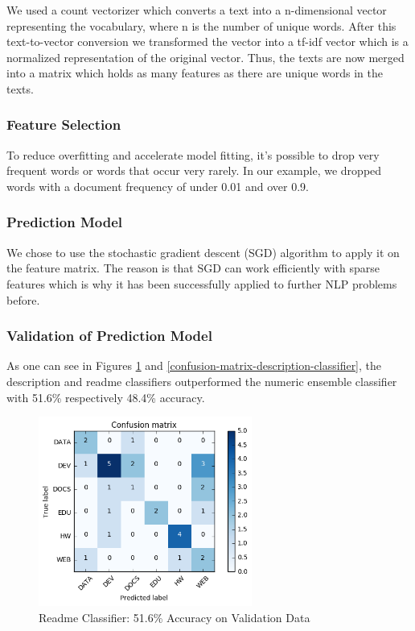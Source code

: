 \documentclass[%
a4paper,
DIV12,
2.5headlines,
bigheadings,
titlepage,
openbib,
]{scrartcl}
\begin{document}
We used a count vectorizer which converts a text into a n-dimensional vector representing the vocabulary, where n is the number of unique words.
After this text-to-vector conversion we transformed the vector into a tf-idf vector which is a normalized representation of the original vector.
Thus, the texts are now merged into a matrix which holds as many features as there are unique words in the texts.

\subsubsection{Feature Selection}\label{feature-selection-1}

To reduce overfitting and accelerate model fitting, it's possible to drop very frequent words or words that occur very rarely.
In our example, we dropped words with a document frequency of under 0.01 and over 0.9.

\subsubsection{Prediction Model}\label{prediction-model-1}

We chose to use the stochastic gradient descent (SGD) algorithm to apply it on the feature matrix.
The reason is that SGD can work efficiently with sparse features which is why it has been successfully applied to further NLP problems before.

\subsubsection{Validation of Prediction Model}\label{validation-of-prediction-model-1}

As one can see in Figures \ref{confusion-matrix-readme-classifier} and \ref{confusion-matrix-description-classifier}, the description and readme classifiers outperformed the numeric ensemble classifier with 51.6\% respectively 48.4\% accuracy.
\begin{figure}[H]
	\centering
		\includegraphics[width=7cm]{graphics/confusion-matrix-readme-classifier.png}
	\caption{Readme Classifier: 51.6\% Accuracy on Validation Data}
	\label{confusion-matrix-readme-classifier}
\end{figure}
\end{document}
